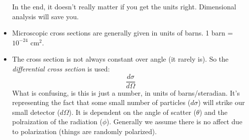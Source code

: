 \documentclass[letter]{article}
\begin{document}
\begin{itemize}
\begin{framed}
  In the end, it doesn't really matter if you get the units
  right. Dimensional analysis will save you.
\end{framed}
\item Microscopic cross sections are generally given in units of
  barns. 1 barn = $10^{-24}$ cm$^2$.
  \item The cross section is not always constant over angle (it rarely
    is). So the \textit{differential cross section} is used:
    \begin{equation*}
      \frac{d\sigma}{d\Omega}
    \end{equation*}
    What is confusing, is this is just
    a number, in units of barns/steradian. It's
    representing the fact that some small number of particles
    ($d\sigma$) will strike our small detector ($d\Omega$). It is
    dependent on the angle of scatter ($\theta$) and the polraization
    of the radiation ($\phi$). Generally we assume there is no affect
    due to polarization (things are randomly polarized).


\end{itemize}
\end{document}
